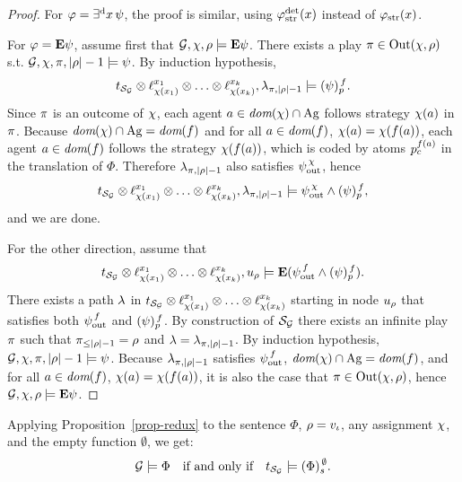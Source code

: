 \begin{proof}
\halfline
For $\phi=\Estratd\psi$, the proof is similar, using $\phistratdet$
instead of $\phistrat$.

 
\halfline
For $\phi=\Eout\psi$,
assume first that $\CGS,\assign,{\fplay}\models\E\psi$. 
There exists a play $\iplay\in\out(\assign,\fplay)$ s.t.
$\CGS,\assign,\iplay,|\fplay|-1\modelsSL \psi$. By induction
hypothesis,
\[\unfold[\KS_{\CGS}]{\sstate_{\pos_\init}}\prodlab
  \stratlab[\assign(\var_1)]{\var_1}\prodlab\ldots \prodlab
  \stratlab[\assign(\var_k)]{\var_k},\tpath_{\iplay,|\fplay|-1} \modelst
  \trp[f]{\psi}.\] Since $\iplay$ is an outcome of $\assign$, each agent $a\in\dom(\assign)\inter\Agf$ 
follows strategy $\assign(a)$ in $\iplay$.
Because  $\dom(\assign)\inter \Agf=\dom(f)$ and for all $a \in \dom(f)$,
  $\assign(a) = \assign(f(a))$, each agent $a\in\dom(f)$ follows
the  strategy $\assign(f(a))$, which is coded by atoms
$p_\mov^{f(\ag)}$ in the translation of $\Phi$. Therefore $\tpath_{\iplay,|\fplay|-1}$ also
satisfies $\psiout$, hence \[\unfold[\KS_{\CGS}]{\sstate_{\pos_\init}}\prodlab
  \stratlab[\assign(\var_1)]{\var_1}\prodlab\ldots \prodlab
  \stratlab[\assign(\var_k)]{\var_k},\tpath_{\iplay,|\fplay|-1} \modelst
  \psiout \et   \trp[f]{\psi},\] and we are done.

  For the other direction, assume that 
  \[\unfold[\KS_{\CGS}]{\sstate_{\pos_\init}}\prodlab
  \stratlab[\assign(\var_1)]{\var_1}\prodlab\ldots \prodlab
  \stratlab[\assign(\var_k)]{\var_k},\noeud_\fplay \modelst
  \E(\psiout[f] \et   \trp[f]{\psi}).\]
There exists a path $\tpath$ in $\unfold[\KS_{\CGS}]{\sstate_{\pos_\init}}\prodlab
  \stratlab[\assign(\var_1)]{\var_1}\prodlab\ldots \prodlab
  \stratlab[\assign(\var_k)]{\var_k}$ starting in
node $\noeud_\fplay$ that satisfies both $\psiout[f]$ and $\trp[f]{\psi}$.
By construction of $\KS_{\CGS}$ there exists an infinite play $\iplay$
such that $\iplay_{\leq |\fplay|-1}=\fplay$ and $\tpath=\tpath_{\iplay,|\fplay|-1}$.
By induction hypothesis, $\CGS,\assign,\iplay,|\fplay|-1 \modelsSL \psi$.
Because $\tpath_{\iplay,|\fplay|-1}$ satisfies $\psiout[f]$, $\dom(\assign)\inter \Agf=\dom(f)$, and for all $a \in \dom(f)$,
  $\assign(a) = \assign(f(a))$, it is also the case that
  $\iplay\in\out(\assign,\fplay)$, 
hence  $\CGS,\assign,\fplay \modelsSL \Eout\psi$.


 \end{proof}
 
 Applying Proposition~\ref{prop-redux} to the sentence $\Phi$, $\fplay=\pos_\init$, any assignment $\assign$, and
 the empty function $\emptyset$, we get:
 \[\CGS \models \Phi \quad \mbox{if and only if}\quad
\unfold[\KS_{\CGS}]{} \models
 \tr[\emptyset]{\Phi}.\]


  
